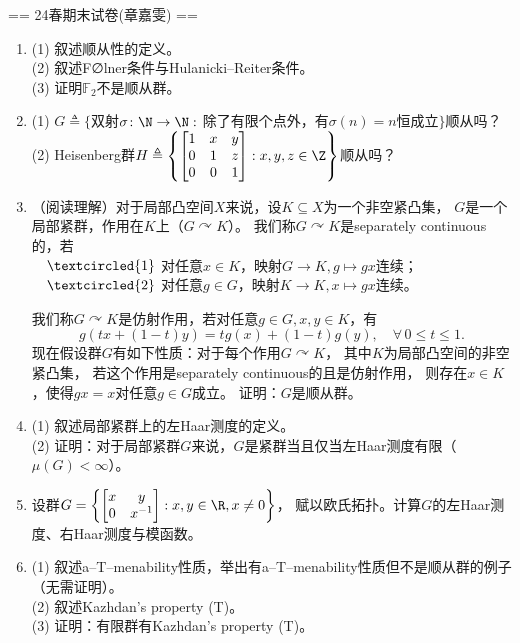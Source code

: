 == 24春期末试卷(章嘉雯) ==
\begin{enumerate}
    \item[一] (1) 叙述顺从性的定义。\\
    (2) 叙述F∅lner条件与Hulanicki--Reiter条件。\\
    (3) 证明$\mathbb{F}_2$不是顺从群。
    \item[二] (1) $G\triangleq\{\!$双射$\sigma\colon\N\to\N:$
    除了有限个点外，有$\sigma(n)=n$恒成立$\!\}$顺从吗？\\
    (2) Heisenberg群$H\triangleq\left\{\begin{bmatrix}1&x&y\\0&1&z\\0&0&1\end{bmatrix}:x,y,z\in\Z\right\}$顺从吗？
    \item[三] （阅读理解）对于局部凸空间$X$来说，设$K \subseteq X$为一个非空紧凸集，
    $G$是一个局部紧群，作用在$K$上（$G \curvearrowright K$）。
    我们称$G \curvearrowright K$是separately continuous的，若\\
    $\quad\textcircled{1}$ 对任意$x \in K$，映射$G \to K,g \mapsto gx$连续；\\
    $\quad\textcircled{2}$ 对任意$g \in G$，映射$K \to K,x \mapsto gx$连续。
    
    我们称$G \curvearrowright K$是仿射作用，若对任意$g \in G,x,y \in K$，有
    \[g(tx+(1-t)y)=tg(x)+(1-t)g(y),\quad\forall\,0 \leqslant t \leqslant 1.\]
    现在假设群$G$有如下性质：对于每个作用$G \curvearrowright K$，
    其中$K$为局部凸空间的非空紧凸集，
    若这个作用是separately continuous的且是仿射作用，
    则存在$x \in K$，使得$gx=x$对任意$g\in G$成立。
    证明：$G$是顺从群。
    \item[四] (1) 叙述局部紧群上的左Haar测度的定义。\\
    (2) 证明：对于局部紧群$G$来说，$G$是紧群当且仅当左Haar测度有限（$\mu(G)<\infty$）。
    \item[五] 设群$G=\left\{\begin{bmatrix}x&y\\0&x^{-1}\end{bmatrix}:x,y\in\R,x\ne0\right\}$，
    赋以欧氏拓扑。计算$G$的左Haar测度、右Haar测度与模函数。
    \item[六] (1) 叙述a--T--menability性质，举出有a--T--menability性质但不是顺从群的例子（无需证明）。\\
    (2) 叙述Kazhdan's property (T)。\\
    (3) 证明：有限群有Kazhdan's property (T)。
\end{enumerate}

